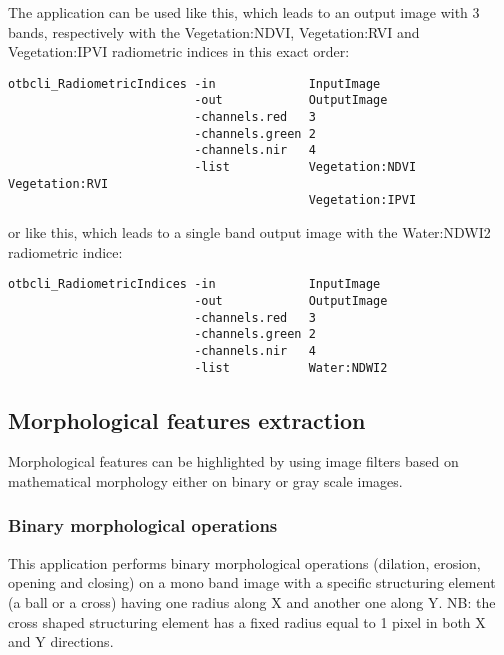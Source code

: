 The application can be used like this, which leads to an output image with 3 bands,
respectively with the Vegetation:NDVI, Vegetation:RVI and Vegetation:IPVI
radiometric indices in this exact order:

\begin{verbatim}
otbcli_RadiometricIndices -in             InputImage
                          -out            OutputImage
                          -channels.red   3
                          -channels.green 2
                          -channels.nir   4
                          -list           Vegetation:NDVI Vegetation:RVI
                                          Vegetation:IPVI 
\end{verbatim}


or like this, which leads to a single band output image with the Water:NDWI2 radiometric indice:
\begin{verbatim}
otbcli_RadiometricIndices -in             InputImage
                          -out            OutputImage
                          -channels.red   3
                          -channels.green 2
                          -channels.nir   4
                          -list           Water:NDWI2 
\end{verbatim}

        




\subsection{Morphological features extraction}\label{ssec:morphofeatextraction}

Morphological features can be highlighted by using image filters based on
mathematical morphology either on binary or gray scale images.

\subsubsection{Binary morphological operations}

This application performs binary morphological operations (dilation, erosion,
opening and closing) on a mono band image with a specific structuring element (a
ball or a cross) having one radius along X and another one along Y. NB: the cross
shaped structuring element has a fixed radius equal to 1 pixel in both X and Y
directions.

